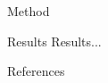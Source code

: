 \documentclass[final,hyperref={pdfpagelabels=false}]{beamer}
\newcommand\eat[1]{}
\begin{document}
\begin{frame}[t]
\begin{columns}[t]
\begin{column}{.45\textwidth}
\begin{block}{\Large Method}
        \eat{Image example:
          \begin{center}
            \texttt{[image: ox\_brand\_cmyk\_rev]}
          \end{center}
        }
      \end{block}

      \begin{block}{\Large Results}
        Results...
      \end{block}

      \begin{block}{\Large References}
        \nocite{*} %
        \linespread{0.928}\selectfont
        \footnotesize{
          }
      \end{block}

    \end{column} %


    \begin{column}{.02\textwidth}\end{column} %

  \end{columns} %
\end{frame} %
\end{document}
